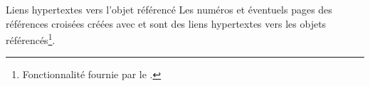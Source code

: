 \documentclass[french,nolocaltoc]{nwejmart}
\newtheorem[style=definition]{fait}
\newtheorem[title=expérience]{experience}
\newtheorem[title-plural=anneaux]{anneau}
\newtheorem[title=idéal,title-plural=idéaux]{ideal}
\begin{document}
\begin{dbremark}{Liens hypertextes vers l'objet référencé}{}
  Les numéros et éventuels  pages des références croisées
  créées avec  et  sont des liens hypertextes vers les
  objets référencés\footnote{Fonctionnalité fournie par le .}.
\end{dbremark}


%
%
\end{document}
